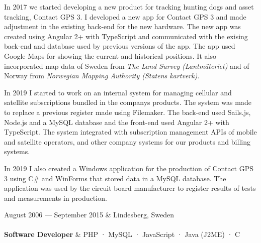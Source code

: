 \documentclass{cv-stylish}
\begin{document}
\begin{center}
\begin{InfoBody}
In 2017 we started developing a new product for tracking hunting dogs
and asset tracking, Contact GPS 3.
I developed a new app for Contact GPS 3 and made adjustment in the
existing back-end for the new hardware. The new app was
created using Angular 2+ with TypeScript and communicated with the
exising back-end and database used by previous versions of the app.
The app used Google Maps for showing the current and historical
positions. It also incorporated map data of Sweden from \emph{The Land
  Survey (Lantmäteriet)} and of Norway from \emph{Norwegian Mapping
  Authority (Statens kartverk)}.

In 2019 I started to work on an internal system for managing cellular and
satellite subscriptions bundled in the companys products. The system
was made to replace a previous register made using Filemaker. The
back-end used Sails.js, Node.js and a MySQL database and the front-end
used Angular 2+ with TypeScript.
The system integrated with subscription management APIs of mobile and
satellite operators, and other company systems for our products and
billing systems.

In 2019 I also created a Windows application for the production of
Contact GPS 3 using C\# and WinForms that stored data in a MySQL
database.
The application was used by the circuit board manufacturer to register
results of tests and measurements in production.

\end{InfoBody}

\vspace{1em}

\begin{JobTable}
  August 2006 --- September 2015 & \hfill Lindesberg, Sweden \\[3pt]
   \\[3pt]
  \hspace{5mm} \textbf{Software Developer}
  & \hfill PHP · MySQL · JavaScript · Java (J2ME) · C \\
\end{JobTable}
\begin{InfoBody}


\end{InfoBody}
\end{center}
\end{document}
